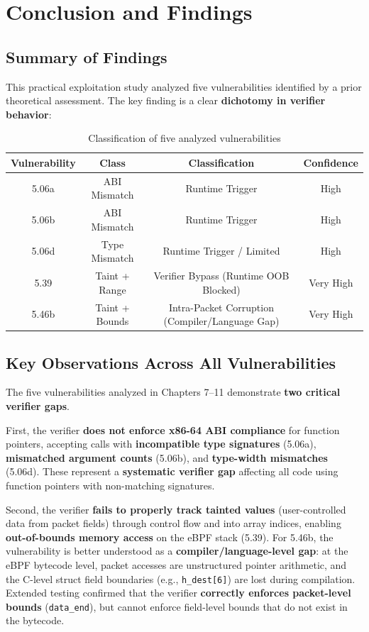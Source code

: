 \chapter{Conclusion and Findings}
\label{ch:conclusion}

\section{Summary of Findings}

\noindent
This practical exploitation study analyzed five vulnerabilities identified by a prior theoretical assessment. The key finding is a clear \textbf{dichotomy in verifier behavior}:

\begin{table}[h]
\centering
\begin{tabular}{|c|c|c|c|}
\hline
\textbf{Vulnerability} & \textbf{Class} & \textbf{Classification} & \textbf{Confidence} \\
\hline
5.06a & ABI Mismatch & Runtime Trigger & High \\
5.06b & ABI Mismatch & Runtime Trigger & High \\
5.06d & Type Mismatch & Runtime Trigger / Limited & High \\
5.39 & Taint + Range & Verifier Bypass (Runtime OOB Blocked) & Very High \\
5.46b & Taint + Bounds & Intra-Packet Corruption (Compiler/Language Gap) & Very High \\
\hline
\end{tabular}
\caption{Classification of five analyzed vulnerabilities}
\end{table}

\section{Key Observations Across All Vulnerabilities}

\noindent
The five vulnerabilities analyzed in Chapters 7--11 demonstrate \textbf{two critical verifier gaps}. 

\noindent
First, the verifier \textbf{does not enforce x86-64 ABI compliance} for function pointers, accepting calls with \textbf{incompatible type signatures} (5.06a), \textbf{mismatched argument counts} (5.06b), and \textbf{type-width mismatches} (5.06d). These represent a \textbf{systematic verifier gap} affecting all code using function pointers with non-matching signatures. 

\noindent
Second, the verifier \textbf{fails to properly track tainted values} (user-controlled data from packet fields) through control flow and into array indices, enabling \textbf{out-of-bounds memory access} on the eBPF stack (5.39). For 5.46b, the vulnerability is better understood as a \textbf{compiler/language-level gap}: at the eBPF bytecode level, packet accesses are unstructured pointer arithmetic, and the C-level struct field boundaries (e.g., \texttt{h\_dest[6]}) are lost during compilation. Extended testing confirmed that the verifier \textbf{correctly enforces packet-level bounds} (\texttt{data\_end}), but cannot enforce field-level bounds that do not exist in the bytecode.

